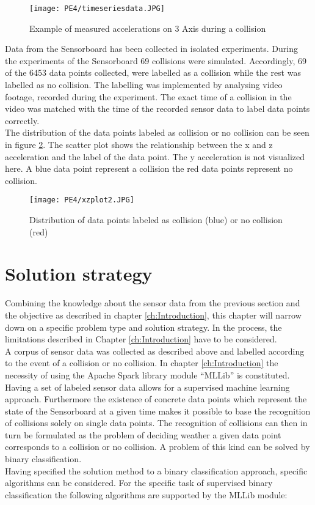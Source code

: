 \begin{figure}[h]
\centering
\texttt{[image: PE4/timeseriesdata.JPG]}
\caption{Example of measured accelerations on 3 Axis during a collision }
\label{fig:timeaxis}
\end{figure}

Data from the Sensorboard has been collected in isolated experiments. During the experiments of the Sensorboard 69 collisions were simulated. Accordingly, 69 of the 6453 data points collected,  were labelled as a collision while the rest was labelled  as no collision. The labelling was implemented by analysing video footage, recorded during the experiment. The exact time of a collision in the video was matched with the time of the recorded sensor data to label data points correctly.\\
The distribution of the data points labeled as collision or no collision can be seen in figure \ref{fig:xyscatter}. The scatter plot shows the relationship between the x and z acceleration and the label of the data point. The y acceleration is not visualized here. A blue data point represent a collision the red data points represent no collision.

\begin{figure}[h]
\centering
\texttt{[image: PE4/xzplot2.JPG]}
\caption{Distribution of data points labeled as collision (blue) or no collision (red)}
\label{fig:xyscatter}
\end{figure}

\section{Solution strategy}
\label{sec:Solution strategy}
Combining the knowledge about the sensor data from the previous section and the objective as described in chapter \ref{ch:Introduction}, this chapter will narrow down on a specific problem type and solution strategy. In the process, the limitations described in Chapter \ref{ch:Introduction} have to be considered. \\
A corpus of sensor data was collected as described above and labelled according to the event of a collision or no collision. In chapter \ref{ch:Introduction}  the necessity of using the Apache Spark library module ``MLLib'' is constituted.
\\ 
Having a set of labeled sensor data allows for a supervised machine learning approach.  Furthermore the existence of concrete data points which represent the state of the Sensorboard at a given time makes it possible to base the recognition of collisions solely on single data points. The recognition of collisions can then in turn be formulated as the problem of deciding weather a given data point corresponds to a collision or no collision. A problem of this kind can be solved by binary classification. \\
Having specified the solution method to a binary classification approach, specific algorithms can be considered. For the specific task of supervised binary classification the following algorithms are supported by the MLLib module:

